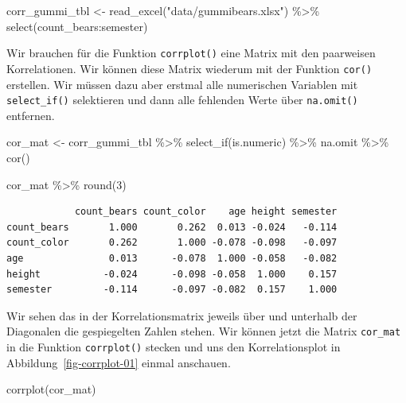 \documentclass[
  letterpaper,
]{scrbook}
\newenvironment{Shaded}{\begin{snugshade}}{\end{snugshade}}
\newcommand{\DecValTok}[1]{\textcolor[rgb]{0.68,0.00,0.00}{#1}}
\newcommand{\FunctionTok}[1]{\textcolor[rgb]{0.28,0.35,0.67}{#1}}
\newcommand{\NormalTok}[1]{\textcolor[rgb]{0.00,0.23,0.31}{#1}}
\newcommand{\OtherTok}[1]{\textcolor[rgb]{0.00,0.23,0.31}{#1}}
\newcommand{\SpecialCharTok}[1]{\textcolor[rgb]{0.37,0.37,0.37}{#1}}
\newcommand{\StringTok}[1]{\textcolor[rgb]{0.13,0.47,0.30}{#1}}
\begin{document}
\begin{Shaded}
\begin{Highlighting}[]
\NormalTok{corr\_gummi\_tbl }\OtherTok{\textless{}{-}} \FunctionTok{read\_excel}\NormalTok{(}\StringTok{"data/gummibears.xlsx"}\NormalTok{) }\SpecialCharTok{\%\textgreater{}\%} 
  \FunctionTok{select}\NormalTok{(count\_bears}\SpecialCharTok{:}\NormalTok{semester)}
\end{Highlighting}
\end{Shaded}

Wir brauchen für die Funktion \texttt{corrplot()} eine Matrix mit den
paarweisen Korrelationen. Wir können diese Matrix wiederum mit der
Funktion \texttt{cor()} erstellen. Wir müssen dazu aber erstmal alle
numerischen Variablen mit \texttt{select\_if()} selektieren und dann
alle fehlenden Werte über \texttt{na.omit()} entfernen.

\begin{Shaded}
\begin{Highlighting}[]
\NormalTok{cor\_mat }\OtherTok{\textless{}{-}}\NormalTok{ corr\_gummi\_tbl }\SpecialCharTok{\%\textgreater{}\%} 
  \FunctionTok{select\_if}\NormalTok{(is.numeric) }\SpecialCharTok{\%\textgreater{}\%} 
\NormalTok{  na.omit }\SpecialCharTok{\%\textgreater{}\%} 
  \FunctionTok{cor}\NormalTok{()}

\NormalTok{cor\_mat }\SpecialCharTok{\%\textgreater{}\%} \FunctionTok{round}\NormalTok{(}\DecValTok{3}\NormalTok{)}
\end{Highlighting}
\end{Shaded}

\begin{verbatim}
            count_bears count_color    age height semester
count_bears       1.000       0.262  0.013 -0.024   -0.114
count_color       0.262       1.000 -0.078 -0.098   -0.097
age               0.013      -0.078  1.000 -0.058   -0.082
height           -0.024      -0.098 -0.058  1.000    0.157
semester         -0.114      -0.097 -0.082  0.157    1.000
\end{verbatim}

Wir sehen das in der Korrelationsmatrix jeweils über und unterhalb der
Diagonalen die gespiegelten Zahlen stehen. Wir können jetzt die Matrix
\texttt{cor\_mat} in die Funktion \texttt{corrplot()} stecken und uns
den Korrelationsplot in Abbildung~\ref{fig-corrplot-01} einmal
anschauen.

\begin{Shaded}
\begin{Highlighting}[]
\FunctionTok{corrplot}\NormalTok{(cor\_mat)}
\end{Highlighting}
\end{Shaded}
\end{document}
